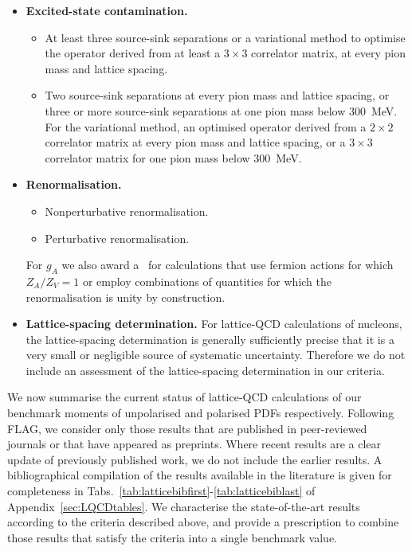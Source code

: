 \begin{itemize}
\item {\bfseries Excited-state contamination.} 
%
\begin{itemize}
%
\item[\bstar] At least three source-sink separations or a variational method 
to optimise the operator derived from at least a $3\times 3$ correlator matrix, 
at every pion mass and lattice spacing.
% 
\item[\bcirc] Two source-sink separations at every pion mass and lattice 
spacing, or three or more source-sink separations at one pion mass below 
300~MeV.
%
For the variational method, an optimised operator derived from a $2\times 2$ 
correlator matrix at every pion mass and lattice spacing, or a $3\times 3$ 
correlator matrix for one pion mass below 300~MeV.
%
\end{itemize}

\item {\bfseries Renormalisation.} 
\begin{itemize}
%
\item[\bstar] Nonperturbative renormalisation.
%
\item[\bcirc] Perturbative renormalisation.
%
\end{itemize}
%
For $g_A$ we also award a \bstar~for calculations that use fermion actions 
for which $Z_A/Z_V=1$ or employ combinations of quantities for which the 
renormalisation is unity by construction.

\item {\bfseries Lattice-spacing determination.} 
For lattice-QCD calculations of nucleons, the lattice-spacing determination is 
generally sufficiently precise that it is a very small or negligible source
of systematic uncertainty. 
%
Therefore we do not include an assessment of the lattice-spacing
determination in our criteria.

\end{itemize}

We now summarise the current status of lattice-QCD calculations of
our benchmark moments of unpolarised and polarised PDFs respectively.
%
Following FLAG, we consider only those results that are published in 
peer-reviewed journals or that have appeared as preprints. 
%
Where recent results are a clear update of previously published work, we do 
not include the earlier results.
%
A bibliographical compilation of the results available in the literature 
is given for completeness in 
Tabs.~\ref{tab:latticebibfirst}-\ref{tab:latticebiblast} 
of Appendix~\ref{sec:LQCDtables}.
%
We characterise the state-of-the-art results according to the criteria 
described above, and provide a prescription to combine those results that satisfy 
the criteria into a single benchmark value.

